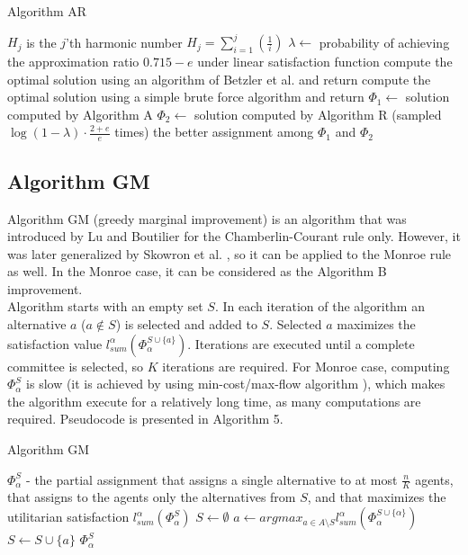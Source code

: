 \begin{algorithm}
\caption{Algorithm AR}\label{euclid}
\begin{algorithmic}[1]
		\State $H_{j}$ is the $j$'th harmonic number $H_{j} = \sum_{i=1}^{j}(\frac{1}{i})$
		\State $\lambda \gets$ probability of achieving the approximation ratio $0.715 - e$ under linear satisfaction function
			\State compute the optimal solution using an algorithm of Betzler et al. \cite{3} and return
		\EndIf
			\State compute the optimal solution using a simple brute force algorithm and return
		\EndIf
		\State $\Phi_{1} \gets$ solution computed by Algorithm A
		\State $\Phi_{2} \gets$ solution computed by Algorithm R (sampled $\log (1 - \lambda) \cdot \frac{2 + e}{e}$ times)
		\State \Return the better assignment among $\Phi_{1}$ and $\Phi_{2}$
	\EndProcedure
\end{algorithmic}
\end{algorithm}

\subsection{Algorithm GM}

Algorithm GM (greedy marginal improvement) is an algorithm that was introduced by Lu and Boutilier \cite{4} for the Chamberlin-Courant rule only. However, it was later generalized by Skowron et al. \cite{1}, so it can be applied to the Monroe rule as well. In the Monroe case, it can be considered as the Algorithm B improvement.
\\

Algorithm starts with an empty set $S$. In each iteration of the algorithm an alternative $a$ ($a \notin S$) is selected and added to $S$. Selected $a$ maximizes the satisfaction value $l_{sum}^{\alpha}(\Phi^{S \cup \{a\}}_{\alpha})$. Iterations are executed until a complete committee is selected, so $K$ iterations are required. For Monroe case, computing $\Phi^{S}_{\alpha}$ is slow (it is achieved by using min-cost/max-flow algorithm \cite{3}), which makes the algorithm execute for a relatively long time, as many computations are required. Pseudocode is presented in Algorithm 5.
\\

\begin{algorithm}
\caption{Algorithm GM}\label{euclid}
\begin{algorithmic}[1]
		\State $\Phi^{S}_{\alpha}$ - the partial assignment that assigns a single alternative to at most $\frac{n}{K}$ agents, that assigns to the agents only the alternatives from $S$, and that maximizes the utilitarian satisfaction $l^{\alpha}_{sum}(\Phi^{S}_{\alpha})$
		\State $S \gets \emptyset$
			\State $a \gets argmax_{a \in A \setminus S} l^{\alpha}_{sum} (\Phi^{S \cup \{\alpha\}}_{\alpha})$
			\State $S \gets S \cup \{a\}$
		\EndFor
		\State \Return $\Phi^{S}_{\alpha}$
	\EndProcedure
\end{algorithmic}
\end{algorithm}

